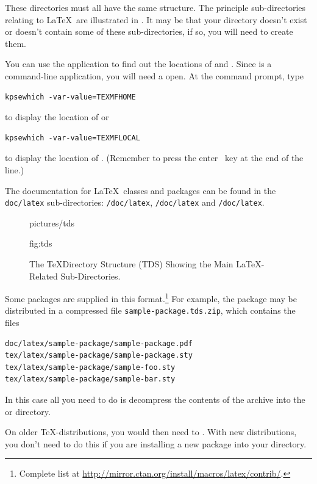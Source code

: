 These directories must all have the same structure. The principle
sub-directories relating to \LaTeX\ are illustrated in
. It may be that your  directory
doesn't exist or doesn't contain some of these sub-directories, if
so, you will need to create them.

You can use the  application to find out the 
locations of  and
. Since  is a command-line
application, you will need a  
open.
At the command prompt, type
\begin{verbatim}
kpsewhich -var-value=TEXMFHOME
\end{verbatim}
to display the location of  or
\begin{verbatim}
kpsewhich -var-value=TEXMFLOCAL
\end{verbatim}
to display the location of .
(Remember to press the enter \enter\ key at the end of the line.)

\label{obj:docdir}%
The documentation for \LaTeX\ classes and packages can be found
in the \texttt{doc\slash latex} sub-directories: \texttt{\slash doc\slash latex},
\texttt{\slash doc\slash latex} and \texttt{\slash doc\slash latex}.

\begin{figure}[htbp]
\figconts
  {pictures/tds}
  {%
    \caption{The \protect\TeX\protect\space Directory Structure (TDS) Showing 
    the Main \protect\LaTeX-Related Sub-Directories.}%
  }%
  {fig:tds}
\end{figure}

Some packages are supplied in this format.\footnote{Complete list at \url{http://mirror.ctan.org/install/macros/latex/contrib/}.} For example, the package
 may be distributed in a compressed file \texttt{sample-package.tds.zip},
which contains the files
\begin{verbatim}
doc/latex/sample-package/sample-package.pdf
tex/latex/sample-package/sample-package.sty
tex/latex/sample-package/sample-foo.sty
tex/latex/sample-package/sample-bar.sty
\end{verbatim}
In this case all you need to do is decompress the contents of 
the archive into the
 or  directory.

\label{obj:runtexhash}%
On older \TeX-distributions, you would then need to . With new distributions, you don't
need to do this if you are installing a new package into your
 directory.

